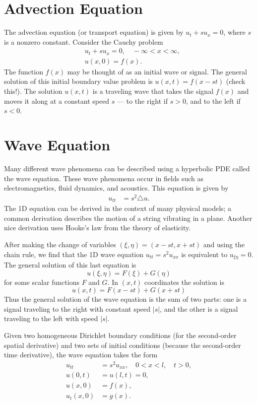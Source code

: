 \label{lab:waveeqn}

\section*{Advection Equation}
The advection equation (or transport equation) is given by $u_t + s u_x = 0$, where $s$ is a nonzero constant.
Consider the Cauchy problem
\begin{align*}
	& u_t + su_x = 0, \quad -\infty < x < \infty,\\\
	& u(x,0) = f(x).
\end{align*}
The function $f(x)$ may be thought of as an initial wave or signal.
The general solution of this initial boundary value problem is $u(x,t) = f(x-st)$ (check this!).
The solution $u(x,t)$ is a traveling wave that takes the signal $f(x)$ and moves it along at a constant speed $s$ --- to the right if $s > 0$, and to the left if $s < 0$.

\section*{Wave Equation}
Many different wave phenomena can be described using a hyperbolic PDE called the wave equation.
These wave phenomena occur in fields such as electromagnetics, fluid dynamics, and acoustics.
This equation is given by
\begin{align}
	u_{tt} &= s^2 \triangle u.
\end{align}
The 1D equation can be derived in the context of many physical models; a common derivation describes the motion of a string vibrating in a plane.
Another nice derivation uses Hooke's law from the theory of elasticity.

After making the change of variables $(\xi,\eta) = (x-st, x + st)$ and using the chain rule, we find that the 1D wave equation $u_{tt} = s^2 u_{xx}$ is equivalent to $u_{\xi \eta} = 0$.
The general solution of this last equation is
\[u(\xi, \eta) = F(\xi) + G(\eta)\]
for some scalar functions $F$ and $G$.
In $(x,t)$ coordinates the solution is
\[u(x,t) = F(x-st) + G(x+st)\]
Thus the general solution of the wave equation is the sum of two parts: one is a signal traveling to the right with constant speed $|s|$, and the other is a signal traveling to the left with speed $|s|$.


Given two homogeneous Dirichlet boundary conditions (for the second-order spatial derivative) and two sets of initial conditions (because the second-order time derivative), the wave equation takes the form
\begin{align*}
	u_{tt} &= s^2 u_{xx}, \quad 0 < x < l, \quad t > 0,\\
	u(0,t) &= u(l,t) = 0, \\
	u(x,0) &= f(x),\\
	u_t(x,0) &= g(x).
\end{align*}

